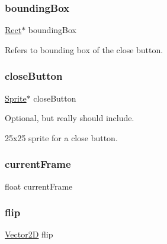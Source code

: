 \subsubsection{\texorpdfstring{bounding\+Box}{boundingBox}}
{\footnotesize\ttfamily \hyperlink{shape_8h_a44e2d24ab2a21b90d03880cab9cc6d16}{Rect}$\ast$ bounding\+Box}



Refers to bounding box of the close button. 

\mbox{\label{structguiwindow__s_a56f2703799c6886a91f0c056eb583141}} 
\subsubsection{\texorpdfstring{close\+Button}{closeButton}}
{\footnotesize\ttfamily \hyperlink{gf2d__sprite_8h_a85b5a622f08c587d1f33fd504a24416e}{Sprite}$\ast$ close\+Button}



Optional, but really should include. 

25x25 sprite for a close button. \mbox{\label{structguiwindow__s_a6c816fc91c0d3b73641b802cc889195d}} 
\subsubsection{\texorpdfstring{current\+Frame}{currentFrame}}
{\footnotesize\ttfamily float current\+Frame}

\mbox{\label{structguiwindow__s_afc50ca9ba71427ea7962929de4b0e1bb}} 
\subsubsection{\texorpdfstring{flip}{flip}}
{\footnotesize\ttfamily \hyperlink{struct_vector2_d}{Vector2D} flip}

\mbox{\label{structguiwindow__s_a4158e9a3af9337e59f9b8de984c0efba}} 
